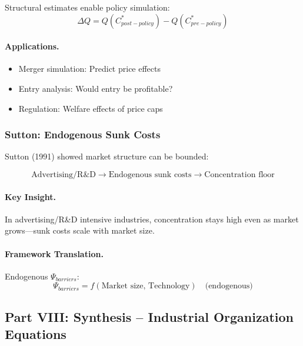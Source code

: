 Structural estimates enable policy simulation:
\begin{equation}
\Delta Q = Q(C^*_{post-policy}) - Q(C^*_{pre-policy})
\end{equation}

\paragraph{Applications.}
\begin{itemize}
    \item Merger simulation: Predict price effects
    \item Entry analysis: Would entry be profitable?
    \item Regulation: Welfare effects of price caps
\end{itemize}

\subsubsection{Sutton: Endogenous Sunk Costs}

Sutton (1991) showed market structure can be bounded:

\begin{equation}
\boxed{
\text{Advertising/R\&D} \to \text{Endogenous sunk costs} \to \text{Concentration floor}
}
\label{eq:sutton}
\end{equation}

\paragraph{Key Insight.}
In advertising/R\&D intensive industries, concentration stays high even as 
market grows---sunk costs scale with market size.

\paragraph{Framework Translation.}
Endogenous $\Psi_{barriers}$:
\begin{equation}
\Psi_{barriers} = f(\text{Market size, Technology}) \quad \text{(endogenous)}
\end{equation}

\subsection{Part VIII: Synthesis – Industrial Organization Equations}

